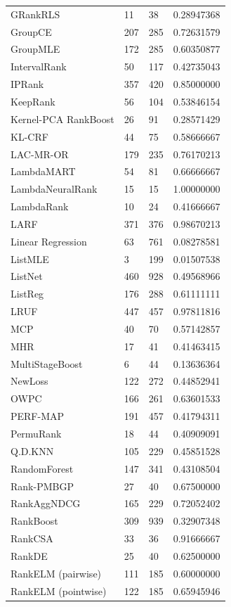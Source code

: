 \documentclass{sig-alternate-2013}
\begin{document}
\begin{longtable}{p{3.2cm}|p{1.3cm}|p{1.3cm}|p{1.4cm}}
GRankRLS & 11 & 38 & 0.28947368 \\ 
GroupCE & 207 & 285 & 0.72631579 \\ 
GroupMLE & 172 & 285 & 0.60350877 \\ 
IntervalRank & 50 & 117 & 0.42735043 \\ 
IPRank & 357 & 420 & 0.85000000 \\ 
KeepRank & 56 & 104 & 0.53846154 \\ 
Kernel-PCA RankBoost & 26 &  91 & 0.28571429 \\ 
KL-CRF &  44 & 75 & 0.58666667 \\ 
LAC-MR-OR & 179 & 235  & 0.76170213 \\ 
LambdaMART & 54 & 81 & 0.66666667 \\ 
LambdaNeuralRank & 15 & 15 & 1.00000000 \\ 
LambdaRank & 10 & 24 & 0.41666667 \\ 
LARF & 371 & 376 & 0.98670213 \\ 
Linear Regression & 63 & 761  & 0.08278581 \\ 
ListMLE & 3 & 199 & 0.01507538 \\ 
ListNet & 460 & 928 & 0.49568966 \\ 
ListReg & 176 & 288 & 0.61111111 \\ 
LRUF & 447 & 457 & 0.97811816 \\ 
MCP & 40 & 70 & 0.57142857 \\ 
MHR & 17 & 41 & 0.41463415 \\ 
MultiStageBoost & 6  & 44 & 0.13636364 \\ 
NewLoss & 122 & 272 & 0.44852941 \\ 
OWPC & 166 & 261 & 0.63601533 \\ 
PERF-MAP & 191 & 457 & 0.41794311 \\ 
PermuRank & 18 & 44 & 0.40909091 \\ 
Q.D.KNN & 105 & 229 & 0.45851528 \\ 
RandomForest & 147 & 341 & 0.43108504 \\ 
Rank-PMBGP & 27 & 40 & 0.67500000 \\ 
RankAggNDCG & 165 & 229 & 0.72052402 \\ 
RankBoost & 309 & 939 & 0.32907348 \\ 
RankCSA & 33 & 36 & 0.91666667 \\ 
RankDE & 25 & 40 & 0.62500000 \\ 
RankELM (pairwise) & 111 & 185 & 0.60000000 \\ 
RankELM (pointwise) & 122 & 185 & 0.65945946 \\ 

\end{longtable}
\end{document}
